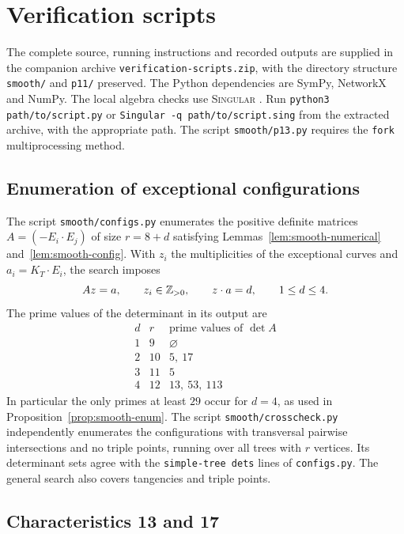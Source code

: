 \section{Verification scripts}\label{app:verification-scripts}

The complete source, running instructions and recorded outputs are supplied in the companion archive \texttt{verification-scripts.zip}, with the directory structure \texttt{smooth/} and \texttt{p11/} preserved.
The Python dependencies are SymPy, NetworkX and NumPy.
The local algebra checks use \textsc{Singular} \cite{Singular}.
Run \texttt{python3 path/to/script.py} or \texttt{Singular -q path/to/script.sing} from the extracted archive, with the appropriate path.
The script \texttt{smooth/p13.py} requires the \texttt{fork} multiprocessing method.

\subsection{Enumeration of exceptional configurations}\label{app:scripts-enumeration}

The script \texttt{smooth/configs.py} enumerates the positive definite matrices $A = (-E_i\cdot E_j)$ of size $r = 8+d$ satisfying Lemmas~\ref{lem:smooth-numerical} and~\ref{lem:smooth-config}.
With $z_i$ the multiplicities of the exceptional curves and $a_i = K_T\cdot E_i$, the search imposes
\[
  Az = a,\qquad z_i\in\mathbb{Z}_{>0},\qquad z\cdot a = d,\qquad 1\leq d\leq 4.
\]
The prime values of the determinant in its output are
\[
\begin{array}{c|c|c}
d & r & \text{prime values of }\det A\\ \hline
1 & 9 & \varnothing\\
2 & 10 & 5,\ 17\\
3 & 11 & 5\\
4 & 12 & 13,\ 53,\ 113
\end{array}
\]
In particular the only primes at least $29$ occur for $d = 4$, as used in Proposition~\ref{prop:smooth-enum}.
The script \texttt{smooth/crosscheck.py} independently enumerates the configurations with transversal pairwise intersections and no triple points, running over all trees with $r$ vertices.
Its determinant sets agree with the \texttt{simple-tree dets} lines of \texttt{configs.py}.
The general search also covers tangencies and triple points.

\subsection{Characteristics 13 and 17}\label{app:scripts-small-primes}

